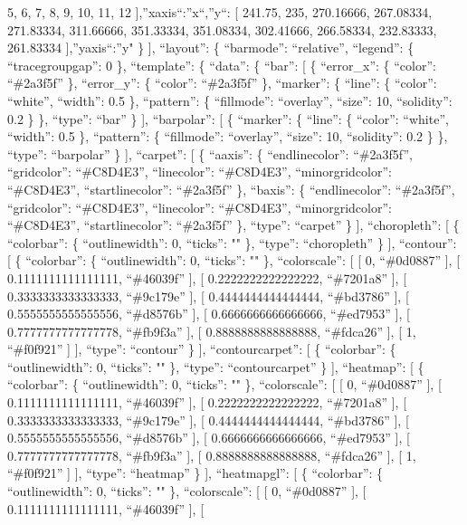 \documentclass[
]{article}
\begin{document}
5, 6, 7, 8, 9, 10, 11, 12 {]},''xaxis``:''x``,''y``: {[} 241.75, 235,
270.16666, 267.08334, 271.83334, 311.66666, 351.33334, 351.08334,
302.41666, 266.58334, 232.83333, 261.83334 {]},''yaxis``:''y" \} {]},
``layout'': \{ ``barmode'': ``relative'', ``legend'': \{
``tracegroupgap'': 0 \}, ``template'': \{ ``data'': \{ ``bar'': {[} \{
``error\_x'': \{ ``color'': ``\#2a3f5f'' \}, ``error\_y'': \{ ``color'':
``\#2a3f5f'' \}, ``marker'': \{ ``line'': \{ ``color'': ``white'',
``width'': 0.5 \}, ``pattern'': \{ ``fillmode'': ``overlay'', ``size'':
10, ``solidity'': 0.2 \} \}, ``type'': ``bar'' \} {]}, ``barpolar'': {[}
\{ ``marker'': \{ ``line'': \{ ``color'': ``white'', ``width'': 0.5 \},
``pattern'': \{ ``fillmode'': ``overlay'', ``size'': 10, ``solidity'':
0.2 \} \}, ``type'': ``barpolar'' \} {]}, ``carpet'': {[} \{ ``aaxis'':
\{ ``endlinecolor'': ``\#2a3f5f'', ``gridcolor'': ``\#C8D4E3'',
``linecolor'': ``\#C8D4E3'', ``minorgridcolor'': ``\#C8D4E3'',
``startlinecolor'': ``\#2a3f5f'' \}, ``baxis'': \{ ``endlinecolor'':
``\#2a3f5f'', ``gridcolor'': ``\#C8D4E3'', ``linecolor'': ``\#C8D4E3'',
``minorgridcolor'': ``\#C8D4E3'', ``startlinecolor'': ``\#2a3f5f'' \},
``type'': ``carpet'' \} {]}, ``choropleth'': {[} \{ ``colorbar'': \{
``outlinewidth'': 0, ``ticks'': "" \}, ``type'': ``choropleth'' \} {]},
``contour'': {[} \{ ``colorbar'': \{ ``outlinewidth'': 0, ``ticks'': ""
\}, ``colorscale'': {[} {[} 0, ``\#0d0887'' {]}, {[} 0.1111111111111111,
``\#46039f'' {]}, {[} 0.2222222222222222, ``\#7201a8'' {]}, {[}
0.3333333333333333, ``\#9c179e'' {]}, {[} 0.4444444444444444,
``\#bd3786'' {]}, {[} 0.5555555555555556, ``\#d8576b'' {]}, {[}
0.6666666666666666, ``\#ed7953'' {]}, {[} 0.7777777777777778,
``\#fb9f3a'' {]}, {[} 0.8888888888888888, ``\#fdca26'' {]}, {[} 1,
``\#f0f921'' {]} {]}, ``type'': ``contour'' \} {]}, ``contourcarpet'':
{[} \{ ``colorbar'': \{ ``outlinewidth'': 0, ``ticks'': "" \}, ``type'':
``contourcarpet'' \} {]}, ``heatmap'': {[} \{ ``colorbar'': \{
``outlinewidth'': 0, ``ticks'': "" \}, ``colorscale'': {[} {[} 0,
``\#0d0887'' {]}, {[} 0.1111111111111111, ``\#46039f'' {]}, {[}
0.2222222222222222, ``\#7201a8'' {]}, {[} 0.3333333333333333,
``\#9c179e'' {]}, {[} 0.4444444444444444, ``\#bd3786'' {]}, {[}
0.5555555555555556, ``\#d8576b'' {]}, {[} 0.6666666666666666,
``\#ed7953'' {]}, {[} 0.7777777777777778, ``\#fb9f3a'' {]}, {[}
0.8888888888888888, ``\#fdca26'' {]}, {[} 1, ``\#f0f921'' {]} {]},
``type'': ``heatmap'' \} {]}, ``heatmapgl'': {[} \{ ``colorbar'': \{
``outlinewidth'': 0, ``ticks'': "" \}, ``colorscale'': {[} {[} 0,
``\#0d0887'' {]}, {[} 0.1111111111111111, ``\#46039f'' {]}, {[}
\end{document}
